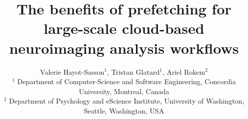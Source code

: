 \documentclass[conference]{IEEEtran}
\begin{document}
\title{The benefits of prefetching for large-scale cloud-based neuroimaging analysis workflows}

\newcommand{\tristan}[1]{\color{orange}\textbf{From Tristan: }#1\color{black}}
\newcommand{\tristanmod}[2]{\color{orange}\sout{#1}{#2}\color{black}}

\newcommand{\ariel}[1]{\color{blue}\textbf{From Ariel:}#1\color{black}}
\newcommand{\arielmod}[2]{\color{blue}\sout{#1}{#2}\color{black}}

\newcommand{\valerie}[1]{\color{purple}\textbf{Valerie: }#1\color{black}}
\newcommand{\valeriemod}[2]{\color{purple}\sout{#1}{#2}\color{black}}


\newcommand{\aws}{AWS\xspace}
\newcommand{\hcp}{HCP\xspace}
\newcommand{\sfs}{S3Fs\xspace}

\author{Valerie Hayot-Sasson$^1$, Tristan Glatard$^1$, Ariel Rokem$^2$ \\ $^1$ Department of Computer-Science and Software Engineering, Concordia University, Montreal, Canada\\ $^2$ Department of Psychology and eScience Institute, University of Washington, Seattle, Washington, USA}
\end{document}
